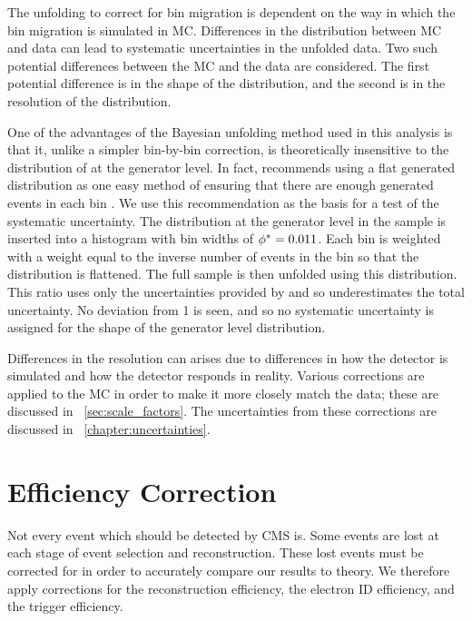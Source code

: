 The unfolding to correct for bin migration is dependent on the way in which the
bin migration is simulated in MC. Differences in the \phistar distribution
between MC and data can lead to systematic uncertainties in the unfolded data.
Two such potential differences between the MC and the data are considered. The
first potential difference is in the shape of the \phistar distribution, and
the second is in the resolution of the \phistar distribution.

One of the advantages of the Bayesian unfolding method used in this analysis is
that it, unlike a simpler bin-by-bin correction, is theoretically insensitive
to the distribution of \phistar at the generator level. In fact, \DAgostini
recommends using a flat generated distribution as one easy method of ensuring
that there are enough generated events in each bin \cite{dagostini_1995}.
 We use this recommendation as the basis for
a test of the systematic uncertainty. The \phistar distribution at the
generator level in the \MADGRAPH sample is inserted into a histogram with bin
widths of $\phi^{*} = 0.011$. Each bin is weighted with a weight equal to the
inverse number of events in the bin so that the distribution is flattened. The
full \POWHEG sample is then unfolded using this \MADGRAPH distribution.
 This ratio uses only the
uncertainties provided by \RooUnfold and so underestimates the total
uncertainty. No deviation from \num{1} is seen, and so no systematic
uncertainty is assigned for the shape of the generator level \phistar
distribution.


Differences in the resolution can arises due to differences in how the
detector is simulated and how the detector responds in reality. Various
corrections are applied to the MC in order to make it more closely match the
data; these are discussed in \SEC~\ref{sec:scale_factors}. The uncertainties
from these corrections are discussed in \CHP~\ref{chapter:uncertainties}.

\section{Efficiency Correction}

Not every event which should be detected by CMS is. Some events are lost at
each stage of event selection and reconstruction. These lost events must be
corrected for in order to accurately compare our results to theory. We
therefore apply corrections for the reconstruction efficiency, the electron ID
efficiency, and the trigger efficiency.

